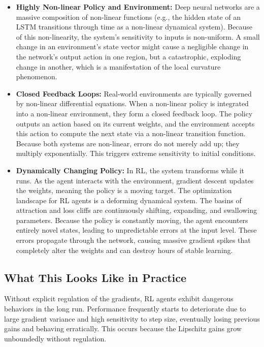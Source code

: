 \documentclass[11pt,a4paper]{article}
\begin{document}
\begin{itemize}
    \item \textbf{Highly Non-linear Policy and Environment:} Deep neural networks are a massive composition of non-linear functions (e.g., the hidden state of an LSTM transitions through time as a non-linear dynamical system). Because of this non-linearity, the system's sensitivity to inputs is non-uniform. A small change in an environment's state vector might cause a negligible change in the network's output action in one region, but a catastrophic, exploding change in another, which is a manifestation of the local curvature phenomenon.
    
    \item \textbf{Closed Feedback Loops:} Real-world environments are typically governed by non-linear differential equations. When a non-linear policy is integrated into a non-linear environment, they form a closed feedback loop. The policy outputs an action based on its current weights, and the environment accepts this action to compute the next state via a non-linear transition function. Because both systems are non-linear, errors do not merely add up; they multiply exponentially. This triggers extreme sensitivity to initial conditions.
    
    \item \textbf{Dynamically Changing Policy:} In RL, the system transforms while it runs. As the agent interacts with the environment, gradient descent updates the weights, meaning the policy is a moving target. The optimization landscape for RL agents is a deforming dynamical system. The basins of attraction and loss cliffs are continuously shifting, expanding, and swallowing parameters. Because the policy is constantly moving, the agent encounters entirely novel states, leading to unpredictable errors at the input level. These errors propagate through the network, causing massive gradient spikes that completely alter the weights and can destroy hours of stable learning.
\end{itemize}

\subsection{What This Looks Like in Practice}
Without explicit regulation of the gradients, RL agents exhibit dangerous behaviors in the long run. Performance frequently starts to deteriorate due to large gradient variance and high sensitivity to step size, eventually losing previous gains and behaving erratically. This occurs because the Lipschitz gains grow unboundedly without regulation.
\end{document}
